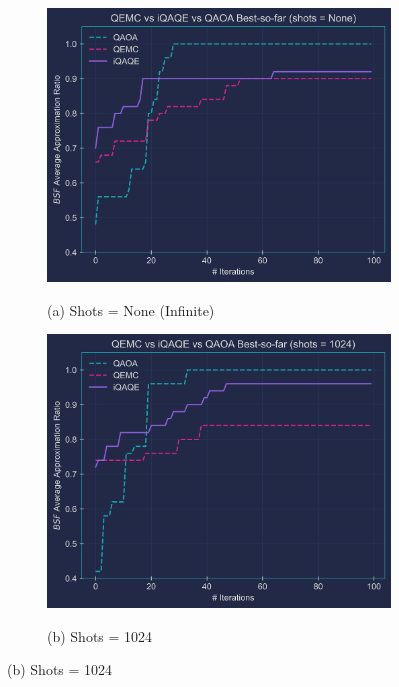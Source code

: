 \begin{figure}[ht!]
  \centering
  \begin{subfigure}[H]{0.495\textwidth}
      \centering
      \caption*{(a) Shots = None (Infinite)}
      \includegraphics[width=1\textwidth]{Figures/Chapter_5/3_Comparison_None.png}
      \label{fig:3_Comparison_shots=None}
  \end{subfigure}
  \begin{subfigure}[H]{0.495\textwidth}
      \centering
      \caption*{(b) Shots = 1024}
      \includegraphics[width=1\textwidth]{Figures/Chapter_5/3_Comparison_1024.png}
      \label{fig:3_Comparison_shots=1024}
  \end{subfigure}


\end{figure}
